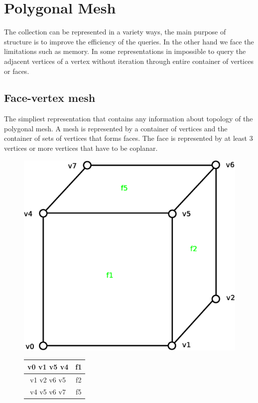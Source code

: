 \section{Polygonal Mesh}

The collection can be represented in a variety ways, the main purpose of structure is to improve
the efficiency of the queries. In the other hand we face the limitations such as memory. In some
representations in impossible to query the adjacent vertices of a vertex without iteration through
entire container of vertices or faces.

\subsection{Face-vertex mesh}
\label{sec:face-vertex}

The simpliest representation that contains any information about topology of the polygonal
mesh. A mesh is represented by a container of vertices and the container of sets of vertices that
forms faces. The face is represented by at least 3 vertices or more vertices that have to be
coplanar.\\

\begin{figure}[h]

\begin{minipage}[hb]{0.65\linewidth}
\centering
\includegraphics[width=0.6\linewidth]{../img/fv_rep_mesh.eps}
\label{fig:figure1}
\end{minipage}
\hspace{0.5cm}
\begin{minipage}[hb]{0.25\linewidth}
\centering
\begin{tabular}{|c|c|}
\hline
\textsf{v0 v1 v5 v4} & \textsf{f1}\\
\hline
\textsf{v1 v2 v6 v5} & \textsf{f2}\\
\hline
\textsf{v4 v5 v6 v7} & \textsf{f5}\\
\hline
\end{tabular}
\label{fig:figure2}
\end{minipage}

\end{figure}

